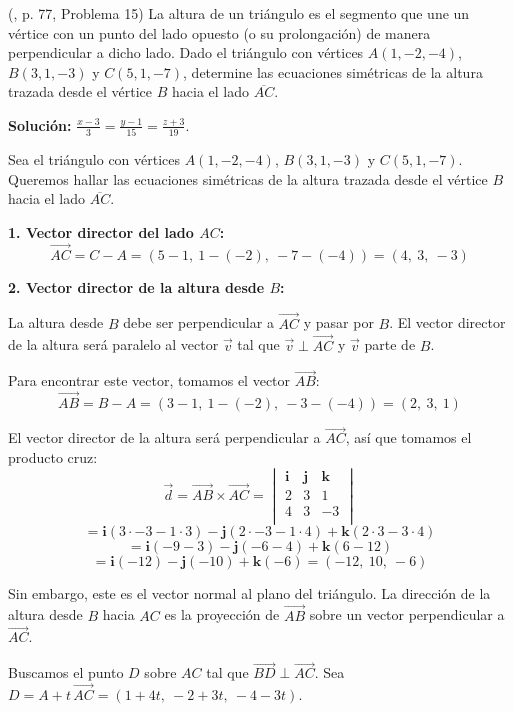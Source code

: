 \begin{prob} (\cite{espinoza2006Algebralineal}, p. 77, Problema 15) La altura de un triángulo es el segmento que une un vértice con un punto del lado opuesto (o su prolongación) de manera perpendicular a dicho lado. Dado el triángulo con vértices $A(1,-2,-4)$, $B(3,1,-3)$ y $C(5,1,-7)$, determine las ecuaciones simétricas de la altura trazada desde el vértice $B$ hacia el lado $\overline{AC}$. 

\textbf{Solución:} $\frac{x-3}{3}=\frac{y-1}{15}=\frac{z+3}{19}$.

\begin{myproof}
Sea el triángulo con vértices $A(1,-2,-4)$, $B(3,1,-3)$ y $C(5,1,-7)$. Queremos hallar las ecuaciones simétricas de la altura trazada desde el vértice $B$ hacia el lado $\overline{AC}$.

\textbf{1. Vector director del lado $AC$:}
\[
\vec{AC} = C - A = (5-1,\ 1-(-2),\ -7-(-4)) = (4,\ 3,\ -3)
\]

\textbf{2. Vector director de la altura desde $B$:}

La altura desde $B$ debe ser perpendicular a $\overrightarrow{AC}$ y pasar por $B$.  
El vector director de la altura será paralelo al vector $\vec{v}$ tal que $\vec{v} \perp \vec{AC}$ y $\vec{v}$ parte de $B$.

Para encontrar este vector, tomamos el vector $\overrightarrow{AB}$:
\[
\overrightarrow{AB} = B - A = (3-1,\ 1-(-2),\ -3-(-4)) = (2,\ 3,\ 1)
\]

El vector director de la altura será perpendicular a $\vec{AC}$, así que tomamos el producto cruz:
\[
\vec{d} = \overrightarrow{AB} \times \overrightarrow{AC}
= \begin{vmatrix}
\mathbf{i} & \mathbf{j} & \mathbf{k} \\
2 & 3 & 1 \\
4 & 3 & -3 \\
\end{vmatrix}
\]
\[
= \mathbf{i}(3 \cdot -3 - 1 \cdot 3) - \mathbf{j}(2 \cdot -3 - 1 \cdot 4) + \mathbf{k}(2 \cdot 3 - 3 \cdot 4)
\]
\[
= \mathbf{i}(-9 - 3) - \mathbf{j}(-6 - 4) + \mathbf{k}(6 - 12)
\]
\[
= \mathbf{i}(-12) - \mathbf{j}(-10) + \mathbf{k}(-6)
= (-12,\ 10,\ -6)
\]

Sin embargo, este es el vector normal al plano del triángulo.  
La dirección de la altura desde $B$ hacia $AC$ es la proyección de $\overrightarrow{AB}$ sobre un vector perpendicular a $\vec{AC}$.

Buscamos el punto $D$ sobre $AC$ tal que $\overrightarrow{BD} \perp \overrightarrow{AC}$.  
Sea $D = A + t\,\overrightarrow{AC} = (1 + 4t,\ -2 + 3t,\ -4 - 3t)$.


\end{myproof}
\end{prob}
